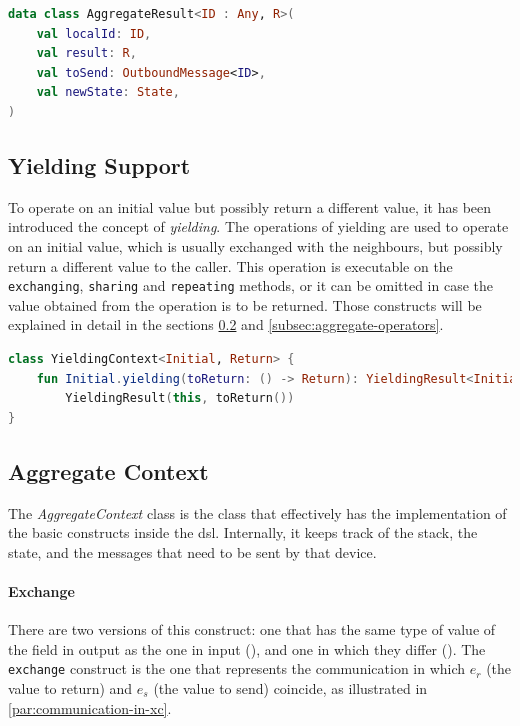\begin{lstlisting}[language=kt,label={lst:aggregateresult}, caption={The signature of the \texttt{aggregate result}.}]
data class AggregateResult<ID : Any, R>(
    val localId: ID,
    val result: R,
    val toSend: OutboundMessage<ID>,
    val newState: State,
)
\end{lstlisting}

\subsection{Yielding Support}
\label{subsec:yielding-support}
To operate on an initial value but possibly return a different value, it has been introduced
the concept of \emph{yielding}.
The operations of yielding are used to operate on an initial value, which is usually exchanged with the neighbours,
but possibly return a different value to the caller.
This operation is executable on the \texttt{exchanging}, \texttt{sharing} and \texttt{repeating} methods, or it can be omitted
in case the value obtained from the operation is to be returned.
Those constructs will be explained in detail in the sections \ref{subsec:aggregate-context} and \ref{subsec:aggregate-operators}.

\begin{lstlisting}[language=kt,label={lst:yieldingcontext}, caption={The signature of the \texttt{yielding context} class.}]
class YieldingContext<Initial, Return> {
    fun Initial.yielding(toReturn: () -> Return): YieldingResult<Initial, Return> =
        YieldingResult(this, toReturn())
}
\end{lstlisting}

\subsection{Aggregate Context}
\label{subsec:aggregate-context}

The \emph{AggregateContext} class is the class that effectively has the implementation of the basic constructs inside the \ac{dsl}.
Internally, it keeps track of the {stack}, the state, and the messages that need to be sent by that device.

\paragraph{Exchange}
There are two versions of this construct: one that has the same type of value of the field in output as the one in input (),
and one in which they differ ().
The \texttt{exchange} construct is the one that represents the communication in which $e_r$ (the value to return)
and $e_s$ (the value to send) coincide, as illustrated in \ref{par:communication-in-xc}.


